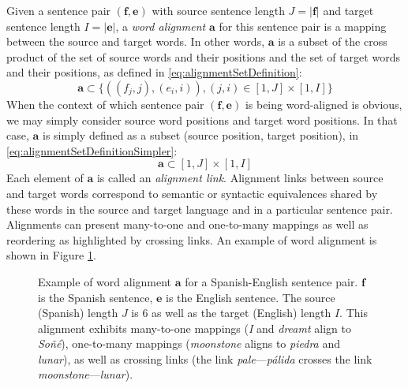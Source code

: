 Given a sentence pair $(\bm{f}, \bm{e})$ with source sentence
length $J = |\bm{f}|$ and target sentence
length $I = |\bm{e}|$, a \emph{word alignment} $\bm{a}$
for this sentence pair is a mapping between the source and target
words. In other words, $\bm{a}$ is a subset of the cross product
of the set of source words and their positions and the set of target
words and their positions, as defined in \autoref{eq:alignmentSetDefinition}:
%
\begin{equation}
  \bm{a} \subset \{((f_j, j), (e_i, i)), (j, i) \in [1, J] \times [1, I]\}
  \label{eq:alignmentSetDefinition}
\end{equation}
%
When the context of which sentence pair $(\bm{f}, \bm{e})$ is
being word-aligned is obvious, we may simply consider source word positions
and target word positions. In that case, $\bm{a}$ is simply defined
as a subset (source position, target position), in
\autoref{eq:alignmentSetDefinitionSimpler}:
%
\begin{equation}
  \bm{a} \subset [1, J] \times [1, I]
  \label{eq:alignmentSetDefinitionSimpler}
\end{equation}
%
Each element of $\bm{a}$ is called an \emph{alignment link}.
Alignment links between source and target words
correspond to semantic or syntactic equivalences shared by these words in the
source and target language and in a particular
sentence pair. Alignments can present many-to-one and one-to-many
mappings as well as reordering as highlighted by crossing links. An example
of word alignment is
shown in Figure \ref{fig:examplealign}.
%
\begin{figure}
  \begin{center}
  \end{center}
  \caption{Example of word alignment $\bm{a}$ for a Spanish-English sentence pair.
    $\bm{f}$ is the Spanish sentence, $\bm{e}$ is the English sentence.
    The source (Spanish)
    length $J$ is 6 as well as the target (English) length $I$. This alignment
    exhibits many-to-one mappings (\emph{I} and \emph{dreamt} align
    to \emph{Soñé}), one-to-many mappings (\emph{moonstone} aligns
    to \emph{piedra} and \emph{lunar}), as well as crossing links
    (the link \emph{pale}---\emph{pálida} crosses the
    link \emph{moonstone}---\emph{lunar}).}
  \label{fig:examplealign}
\end{figure}
